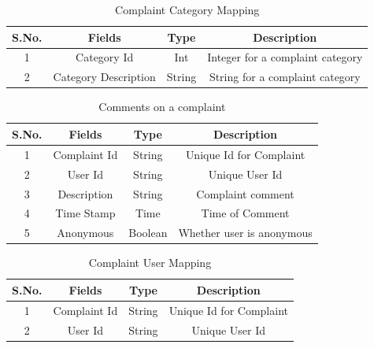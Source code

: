 \documentclass{article}
\begin{document}
\begin{table}[H]
\centering
\caption{Complaint Category Mapping}
\label{my-label}
\begin{tabular}{|c|c|c|c|}
\hline
\textbf{S.No.} & \textbf{Fields}      & \textbf{Type} & \textbf{Description}             \\ \hline
1              & Category Id          & Int           & Integer for a complaint category \\ \hline
2              & Category Description & String        & String for a complaint category  \\ \hline
\end{tabular}
\end{table}


\begin{table}[H]
\centering
\caption{Comments on a complaint}
\label{my-label}
\begin{tabular}{|c|c|c|c|}
\hline
\textbf{S.No.} & \textbf{Fields} & \textbf{Type} & \textbf{Description}    \\ \hline
1              & Complaint Id    & String        & Unique Id for Complaint \\ \hline
2              & User Id         & String        & Unique User Id          \\ \hline
3              & Description     & String        & Complaint comment       \\ \hline
4              & Time Stamp      & Time          & Time of Comment         \\ \hline
5              & Anonymous      & Boolean          & Whether user is anonymous         \\ \hline
\end{tabular}
\end{table}


\begin{table}[H]
\centering
\caption{Complaint User Mapping}
\label{my-label}
\begin{tabular}{|c|c|c|c|}
\hline
\textbf{S.No.} & \textbf{Fields} & \textbf{Type} & \textbf{Description}    \\ \hline
1              & Complaint Id    & String        & Unique Id for Complaint \\ \hline
2              & User Id         & String        & Unique User Id          \\ \hline
\end{tabular}
\end{table}
\end{document}
